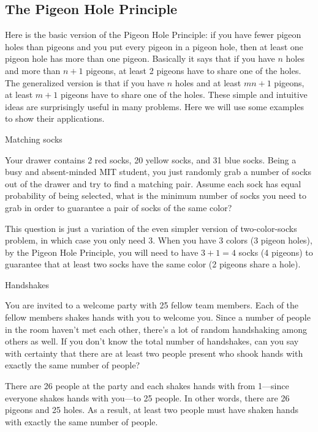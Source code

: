 \subsection{The Pigeon Hole Principle}

Here is the basic version of the Pigeon Hole Principle: if you have fewer pigeon holes
than pigeons and you put every pigeon in a pigeon hole, then at least one pigeon hole has
more than one pigeon. Basically it says that if you have $n$ holes and more than $n+1$
pigeons, at least 2 pigeons have to share one of the holes. The generalized version is that
if you have $n$ holes and at least $mn+1$ pigeons, at least $m+1$ pigeons have to share one
of the holes. These simple and intuitive ideas are surprisingly useful in many problems.
Here we will use some examples to show their applications.

\begin{problem}{Matching socks}

Your drawer contains 2 red socks, 20 yellow socks, and 31 blue socks. Being a busy and
absent-minded MIT student, you just randomly grab a number of socks out of the drawer
and try to find a matching pair. Assume each sock has equal probability of being selected,
what is the minimum number of socks you need to grab in order to guarantee a pair of
socks of the same color?
\end{problem}

\begin{solution}
This question is just a variation of the even simpler version of two-color-socks problem,
in which case you only need 3. When you have 3 colors (3 pigeon holes), by the Pigeon Hole
Principle, you will need to have $3+1=4$ socks (4 pigeons) to guarantee that at least two
socks have the same color (2 pigeons share a hole).
\end{solution}

\begin{problem}{Handshakes}

You are invited to a welcome party with 25 fellow team members. Each of the fellow
members shakes hands with you to welcome you. Since a number of people in the room
haven't met each other, there's a lot of random handshaking among others as well. If you
don't know the total number of handshakes, can you say with certainty that there are at
least two people present who shook hands with exactly the same number of people?
\end{problem}

\begin{solution}
There are 26 people at the party and each shakes hands with from 1---since everyone shakes
hands with you---to 25 people. In other words, there are 26 pigeons and 25 holes. As a result,
at least two people must have shaken hands with exactly the same number of people.
\end{solution}


